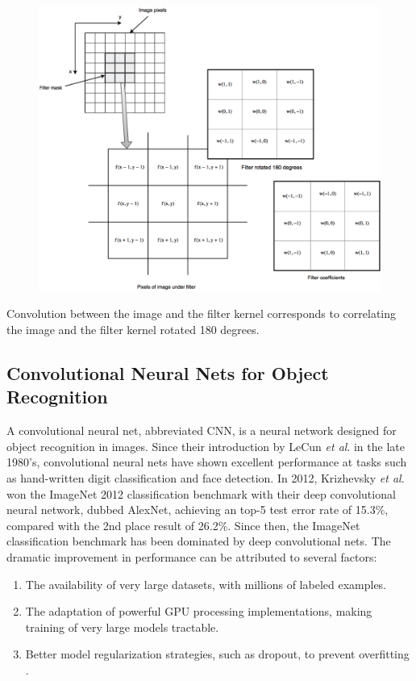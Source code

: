 \begin{figure}[H]
	\centering
	\includegraphics[width=.8\linewidth]{fig/digimageproc.png}
	\caption{}
	\label{fig:spatial_filter}
\end{figure}
Convolution between the image and the filter kernel corresponds to correlating the image and the filter kernel rotated 180 degrees.
\subsection{Convolutional Neural Nets for Object Recognition}
A convolutional neural net, abbreviated CNN, is a neural network designed for object recognition in images. Since their introduction by LeCun \textit{et al}. \cite{lecun-89e} in the late 1980's, convolutional neural nets have shown excellent performance at tasks such as hand-written digit classification and face detection. In 2012, Krizhevsky \textit{et al}. \cite{NIPS2012_4824} won the ImageNet 2012 classification benchmark with their deep convolutional neural network, dubbed AlexNet, achieving an top-5 test error rate of 15.3\%, compared with the 2nd place result of 26.2\%. Since then, the ImageNet classification benchmark has been dominated by deep convolutional nets. The dramatic improvement in performance can be attributed to several factors:
\begin{enumerate}
	\item The availability of very large datasets, with millions of labeled examples.
	\item The adaptation of powerful GPU processing implementations, making training of very large models tractable.
	\item Better model regularization strategies, such as dropout, to prevent overfitting \cite{dropout}.
\end{enumerate}

